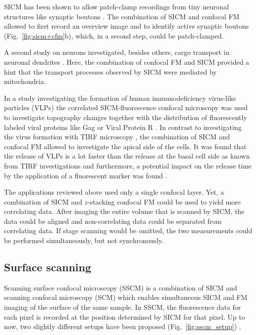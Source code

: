 SICM has been shown to allow patch-clamp recordings from tiny neuronal
structures like synaptic boutons \cite{Novak2013}. The combination of SICM and
confocal FM allowed to first record an overview image and to identify active
synaptic boutons (Fig.~\ref{fig:sicm+cfm}b), which, in a second step, could be
patch-clamped.

A second study on neurons investigated, besides others, cargo transport in
neuronal dendrites \cite{Takahashi2019}. Here, the combination of
confocal FM and SICM provided a hint that the transport processes observed by
SICM were mediated by mitochondria.


In a study investigating the formation of human immunodeficiency virus-like
particles (VLPs) the correlated SICM-fluorescence confocal microscopy was used
to investigate topography changes together with the distribution of
fluorescently labeled viral proteins like Gag or Viral Protein R
\cite{Bednarska2020}. In contrast to investigating the virus formation with
TIRF microscopy \cite{Jouvenet2008}, the combination of SICM and confocal FM
allowed to investigate the apical side of the cells. It was found that the
release of VLPs is a lot faster than the release at the basal cell side as
known from TIRF investigations and furthermore, a potential impact on the
release time by the application of a fluorescent marker was found
\cite{Bednarska2020}.

The applications reviewed above used only a single confocal layer. Yet,
a combination of SICM and $z$-stacking confocal FM could be used to yield more
correlating data. After imaging the entire volume that is scanned by SICM, the
data could be aligned and non-correlating data could be separated from
correlating data. If stage scanning would be omitted, the two measurements
could be performed simultaneously, but not synchronously.  


\subsection{Surface scanning}

Scanning surface confocal microscopy (SSCM) \cite{Gorelik2002a} is a
combination of SICM and scanning confocal microscopy (SCM) which enables
simultaneous SICM and FM imaging of the surface of the same sample. In SSCM,
the fluorescence data for each pixel is recorded at the position determined by
SICM for that pixel. Up to now, two slightly different setups have been proposed
(Fig.~\ref{fig:sscm_setup}) \cite{Gorelik2002a,Shevchuk2013}.

